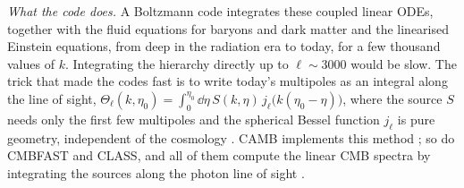 \emph{What the code does.} A Boltzmann code integrates these coupled linear ODEs, together with
the fluid equations for baryons and dark matter and the linearised Einstein equations, from deep
in the radiation era to today, for a few thousand values of $k$. Integrating the hierarchy
directly up to $\ell\sim3000$ would be slow. The trick that made the codes fast is to write
today's multipoles as an integral along the line of sight,
$\Theta_\ell(k,\eta_0)=\int_0^{\eta_0}\dd\eta\,S(k,\eta)\,j_\ell\bigl(k(\eta_0-\eta)\bigr)$,
where the source $S$ needs only the first few multipoles and the spherical Bessel function
$j_\ell$ is pure geometry, independent of the cosmology \cite{Seljak1996}. CAMB implements this
method \cite{CAMB2000}; so do CMBFAST and CLASS, and all of them compute the linear CMB spectra
by integrating the sources along the photon line of sight .

